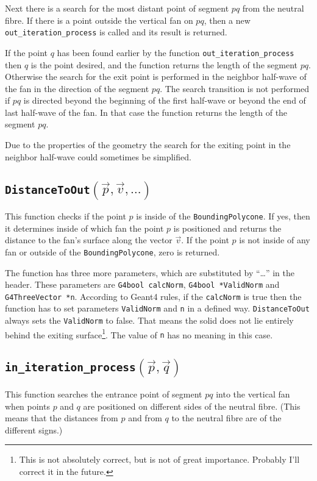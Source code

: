 \documentclass{article}
\begin{document}
Next there is a search for the most distant point of segment
$pq$ from the neutral fibre.
If there is a point outside the vertical fan on $pq$, then a
new {\tt out\_iteration\_process} is called and its result is returned.

If the point $q$ has been found
earlier by the function {\tt out\_iteration\_process} then $q$ is the point
desired, and the function returns the length of the segment $pq$. Otherwise the
search for the exit point is performed in the neighbor half-wave of the fan
in the direction of the segment $pq$.
The search transition is not performed if $pq$ is directed beyond the beginning of the
first half-wave or beyond the end of last half-wave of the fan. In that case the
function returns the length of the segment $pq$.

Due to the properties of the geometry the search for the exiting point in the
neighbor half-wave could sometimes be simplified.

\subsection{\tt DistanceToOut$(\vec{p}, \vec{v}, \dots)$}
This function checks if the point $p$ is inside of the {\tt BoundingPolycone}. If
yes, then it determines inside of which fan the point $p$ is positioned and
returns the distance to the fan's surface along the vector $\vec{v}$. If the
point $p$ is not inside of any fan or outside of the
{\tt BoundingPolycone}, zero is returned.

The function has three more parameters, which are substituted by ``\dots'' in
the header. These parameters are {\tt G4bool calcNorm}, {\tt G4bool *ValidNorm}
and {\tt G4ThreeVector *n}. According to Geant4 rules, if the {\tt calcNorm} is
true then the function has to set parameters {\tt *ValidNorm} and
{\tt *n} in a defined way. {\tt DistanceToOut} always sets the {\tt *ValidNorm} to false. That
means the solid does not lie entirely behind the exiting surface\footnote{This
is not absolutely correct, but is not of great importance. Probably I'll correct
it in the future.}.
The value of {\tt *n} has no meaning in this case.

\subsection{\tt in\_iteration\_process$(\vec{p}, \vec{q})$}
This function searches the entrance point of segment $pq$ into the vertical
fan when points $p$ and $q$ are positioned on different
sides of the neutral fibre. (This means that the distances from $p$ and from $q$ to
the neutral fibre are of the different signs.) 
\end{document}

